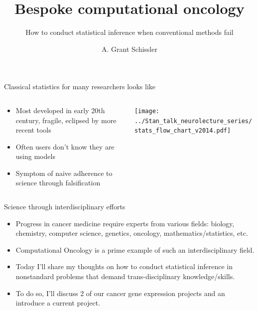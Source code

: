 \documentclass[ignorenonframetext,aspectratio=169,]{beamer}
\title{Bespoke computational oncology}
\subtitle{How to conduct statistical inference when conventional methods fail}
\author{A. Grant Schissler}
\institute{Department of Mathematics and Statistics University of Nevada, Reno}
\date{}
\begin{document}
\frame{\titlepage}

\begin{frame}{%
\protect\hypertarget{classical-statistics-for-many-researchers-looks-like}{%
Classical statistics for many researchers looks like}}

\begin{columns}
\begin{column}{0.5\textwidth}  
    \begin{center}
    \begin{itemize}
        \setlength\itemsep{1em}
        \item Most developed in early 20th century, fragile, eclipsed by more recent tools
        \item Often users don’t know they are using models
        \item Symptom of naive adherence to science through falsification
    \end{itemize}
     \end{center}
\end{column}
\begin{column}{0.5\textwidth}
    \texttt{[image: ../Stan\_talk\_neurolecture\_series/stats\_flow\_chart\_v2014.pdf]}
\end{column}
\end{columns}

\end{frame}

\begin{frame}{%
\protect\hypertarget{science-through-interdisciplinary-efforts}{%
Science through interdisciplinary efforts}}

\begin{itemize}
\item
  Progress in cancer medicine require experts from various fields:
  biology, chemistry, computer science, genetics, oncology,
  mathematics/statistics, etc.
\item
  Computational Oncology is a prime example of such an interdisciplinary
  field.
\item
  Today I’ll share my thoughts on how to conduct statistical inference
  in nonstandard problems that demand trans-disciplinary
  knowledge/skills.
\item
  To do so, I’ll discuss 2 of our cancer gene expression projects and an
  introduce a current project.
\end{itemize}

\end{frame}
\end{document}
